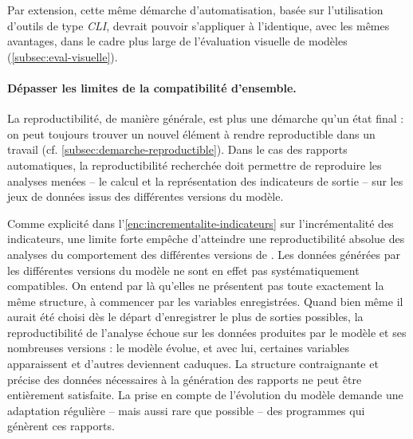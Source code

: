 Par extension, cette même démarche d'automatisation, basée sur l'utilisation d'outils de type \textit{CLI}, devrait pouvoir s'appliquer à l'identique, avec les mêmes avantages, dans le cadre plus large de l'évaluation visuelle de modèles (\cref{subsec:eval-visuelle}).

%
%


\paragraph{Dépasser les limites de la compatibilité d'ensemble.}
La reproductibilité, de manière générale, est plus une démarche qu'un état final : on peut toujours trouver un nouvel élément à \og rendre reproductible\fg{} dans un travail (cf. \cref{subsec:demarche-reproductible}).
Dans le cas des rapports automatiques, la reproductibilité recherchée doit permettre de reproduire les analyses menées -- le calcul et la représentation des indicateurs de sortie -- sur les jeux de données issus des différentes versions du modèle.

Comme explicité dans l'\cref{enc:incrementalite-indicateurs} sur l'incrémentalité des indicateurs, une limite forte empêche d'atteindre une reproductibilité absolue des analyses du comportement des différentes versions de \simfeodal{}.
Les données générées par les différentes versions du modèle ne sont en effet pas systématiquement compatibles.
On entend par là qu'elles ne présentent pas toute exactement la même structure, à commencer par les variables enregistrées.
Quand bien même il aurait été choisi dès le départ d'enregistrer le plus de sorties possibles, la reproductibilité de l'analyse échoue sur les données produites par le modèle et ses nombreuses versions : le modèle évolue, et avec lui, certaines variables apparaissent et d'autres deviennent caduques.
La structure contraignante et précise des données nécessaires à la génération des rapports ne peut être entièrement satisfaite.
La prise en compte de l'évolution du modèle demande une adaptation régulière -- mais aussi rare que possible -- des programmes qui génèrent ces rapports.

